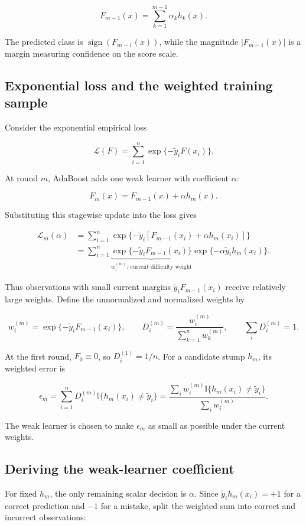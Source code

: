 \documentclass[11pt]{article}
\newcommand{\ind}{\mathbb{1}}
\renewcommand{\ind}{\mathbb{I}}
\begin{document}
\[
 F_{m-1}(x)=\sum_{k=1}^{m-1}\alpha_k h_k(x).
\]

The predicted class is $\operatorname{sign}(F_{m-1}(x))$, while the magnitude
$|F_{m-1}(x)|$ is a margin measuring confidence on the score scale.

\subsection{Exponential loss and the weighted training sample}

Consider the exponential empirical loss

\[
 \mathcal L(F)=\sum_{i=1}^n \exp\{-\tilde y_i F(x_i)\}.
\]

At round $m$, AdaBoost adds one weak learner with coefficient $\alpha$:

\[
 F_m(x)=F_{m-1}(x)+\alpha h_m(x).
\]

Substituting this stagewise update into the loss gives

\begin{align*}
\mathcal L_m(\alpha)
&=\sum_{i=1}^n
  \exp\{-\tilde y_i[F_{m-1}(x_i)+\alpha h_m(x_i)]\}\\
&=\sum_{i=1}^n
  \underbrace{\exp\{-\tilde y_iF_{m-1}(x_i)\}}_{w_i^{(m)}:\ \text{current difficulty weight}}
  \exp\{-\alpha\tilde y_i h_m(x_i)\}.
\end{align*}

Thus observations with small current margins
$\tilde y_iF_{m-1}(x_i)$ receive relatively large weights. Define the
unnormalized and normalized weights by

\[
 w_i^{(m)}=\exp\{-\tilde y_iF_{m-1}(x_i)\},
 \qquad
 D_i^{(m)}=\frac{w_i^{(m)}}{\sum_{k=1}^n w_k^{(m)}},
 \qquad \sum_i D_i^{(m)}=1.
\]

At the first round, $F_0\equiv0$, so $D_i^{(1)}=1/n$. For a candidate stump
$h_m$, its weighted error is

\[
 \epsilon_m
 =\sum_{i=1}^n D_i^{(m)}\ind\{h_m(x_i)\neq \tilde y_i\}
 =\frac{\sum_i w_i^{(m)}\ind\{h_m(x_i)\neq\tilde y_i\}}
 {\sum_iw_i^{(m)}}.
\]

The weak learner is chosen to make $\epsilon_m$ as small as possible under the
current weights.

\subsection{Deriving the weak-learner coefficient}

For fixed $h_m$, the only remaining scalar decision is $\alpha$. Since
$\tilde y_i h_m(x_i)=+1$ for a correct prediction and $-1$ for a mistake, split
the weighted sum into correct and incorrect observations:
\end{document}

